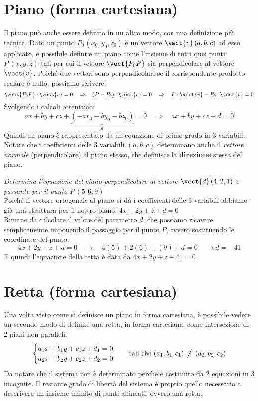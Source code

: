 \section{Piano (forma cartesiana)}
Il piano può anche essere definito in un altro modo, con una definizione più tecnica. Dato un punto $P_0\,(x_0,y_0,z_0)$ e un vettore $\vect{v}\,(a,b,c)$ ad esso applicato, è possibile definire un piano come l'insieme di tutti quei punti $P\,(x,y,z)$ tali per cui il vettore $\vect{P_0P}$ sia perpendicolare al vettore $\vect{v}$. Poiché due vettori sono perpendicolari se il corrispondente prodotto scalare è nullo, possiamo scrivere:
\[\vect{P_0P} \cdot \vect{v} =0 \quad \Rightarrow \quad (P-P_0)\cdot \vect{v}=0 \quad \Rightarrow \quad P \cdot \vect{v}-P_0\cdot \vect{v}=0\]
Svolgendo i calcoli otteniamo:
\[ a x+by+cz + \underbrace{(-a x_0-by_0-bz_0)}_{d}=0 \quad \Rightarrow \quad \boxed{ax+by+cz+d=0}\]
Quindi un piano è rappresentato da un'equazione di primo grado in 3 variabili. Notare che i coefficienti delle 3 variabili $(a,b,c)$ determinano anche il \emph{vettore normale} (perpendicolare) al piano stesso, che definisce la \textbf{direzione} stessa del piano. 
\begin{esempio}
 \emph{Determina l'equazione del piano perpendicolare al vettore $\vect{d} \, (4,2,1)$ e passante per il punto $P\, (5,6,9)$}\\[5pt]
Poiché il vettore ortogonale al piano ci dà i coefficienti delle 3 variabili abbiamo già una struttura per il nostro piano: \(4x+2y+z +d=0\)\\[3pt]
Rimane da calcolare il valore del parametro $d$, che possiamo ricavare semplicemente imponendo il passaggio per il punto $P$, ovvero sostituendo le coordinate del punto:
\[4x+2y+z+d=0 \quad \longrightarrow \quad 4 (5)+2 (6)+(9)+d=0 \quad \rightarrow d = -41\]
E quindi l'equazione della retta è data da \(4x+2y+z-41=0\)
\end{esempio}

\section{Retta (forma cartesiana)}

Una volta visto come si definisce un piano in forma cartesiana, è possibile vedere un secondo modo di definire una retta, in forma cartesiana, come intersezione di 2 piani non paralleli.
\[\begin{cases}
a_1 x+b_1y+c_1 z+d_1 = 0 \\
a_2 x+b_2y+c_2 z+d_2 = 0
\end{cases} \quad \text{tali che } (a_1,b_1,c_1) \;\; \cancel{\parallel}\;\; (a_2,b_2,c_2)\]
Da notare che il sistema non è determinato perché è costituito da 2 equazioni in 3 incognite. Il restante grado di libertà del sistema è proprio quello necessario a descrivere un insieme infinito di punti allineati, ovvero una retta.


